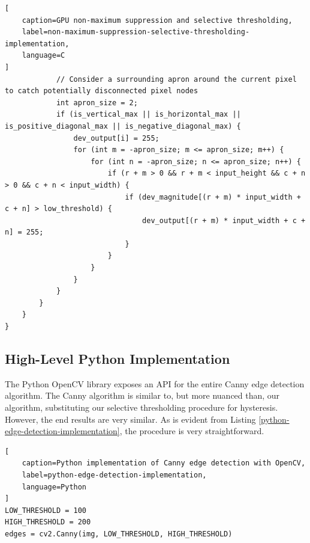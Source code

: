 \documentclass[journal]{IEEEtran}
\begin{document}
\begin{lstlisting}[
	caption=GPU non-maximum suppression and selective thresholding,
	label=non-maximum-suppression-selective-thresholding-implementation,
	language=C
]
			// Consider a surrounding apron around the current pixel to catch potentially disconnected pixel nodes
			int apron_size = 2;
			if (is_vertical_max || is_horizontal_max || is_positive_diagonal_max || is_negative_diagonal_max) {
				dev_output[i] = 255;
				for (int m = -apron_size; m <= apron_size; m++) {
					for (int n = -apron_size; n <= apron_size; n++) {
						if (r + m > 0 && r + m < input_height && c + n > 0 && c + n < input_width) {
							if (dev_magnitude[(r + m) * input_width + c + n] > low_threshold) {
								dev_output[(r + m) * input_width + c + n] = 255;
							}
						}
					}
				}
			}
		}
    }
}
\end{lstlisting}

\subsection{High-Level Python Implementation}
The Python OpenCV library exposes an API for the entire Canny edge detection algorithm. The Canny algorithm is similar to, but more nuanced than, our algorithm, substituting our selective thresholding procedure for hysteresis. However, the end results are very similar. As is evident from Listing \ref{python-edge-detection-implementation}, the procedure is very straightforward.
\begin{lstlisting}[
	caption=Python implementation of Canny edge detection with OpenCV,
	label=python-edge-detection-implementation,
	language=Python
]
LOW_THRESHOLD = 100
HIGH_THRESHOLD = 200
edges = cv2.Canny(img, LOW_THRESHOLD, HIGH_THRESHOLD)
\end{lstlisting}
\end{document}
